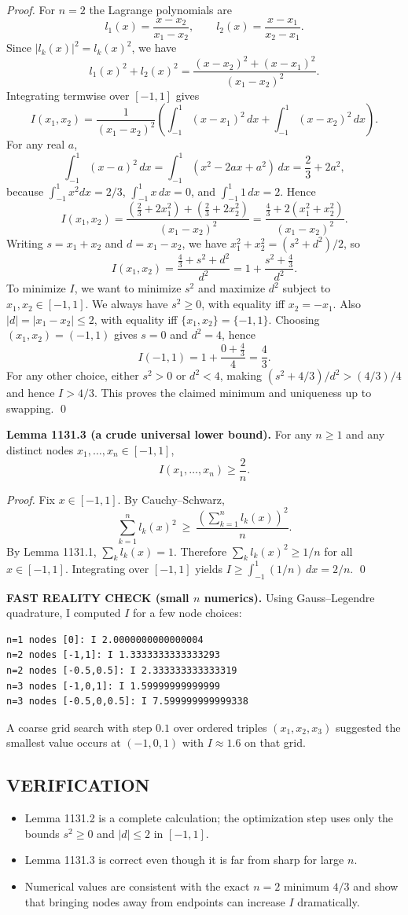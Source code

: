 \emph{Proof.}
For $n=2$ the Lagrange polynomials are
\[
 l_1(x)=\frac{x-x_2}{x_1-x_2},\qquad l_2(x)=\frac{x-x_1}{x_2-x_1}.
\]
Since $|l_k(x)|^2=l_k(x)^2$, we have
\[
 l_1(x)^2+l_2(x)^2 = \frac{(x-x_2)^2+(x-x_1)^2}{(x_1-x_2)^2}.
\]
Integrating termwise over $[-1,1]$ gives
\[
I(x_1,x_2)=\frac{1}{(x_1-x_2)^2}\left(\int_{-1}^1 (x-x_1)^2\,dx+\int_{-1}^1 (x-x_2)^2\,dx\right).
\]
For any real $a$,
\[
\int_{-1}^1 (x-a)^2\,dx=\int_{-1}^1 (x^2-2ax+a^2)\,dx=\frac{2}{3}+2a^2,
\]
because $\int_{-1}^1 x^2 dx=2/3$, $\int_{-1}^1 x\,dx=0$, and $\int_{-1}^1 1\,dx=2$.
Hence
\[
I(x_1,x_2)=\frac{(\frac{2}{3}+2x_1^2)+(\frac{2}{3}+2x_2^2)}{(x_1-x_2)^2}
=\frac{\frac{4}{3}+2(x_1^2+x_2^2)}{(x_1-x_2)^2}.
\]
Writing $s=x_1+x_2$ and $d=x_1-x_2$, we have $x_1^2+x_2^2=(s^2+d^2)/2$, so
\[
I(x_1,x_2)=\frac{\frac{4}{3}+s^2+d^2}{d^2}=1+\frac{s^2+\frac{4}{3}}{d^2}.
\]
To minimize $I$, we want to minimize $s^2$ and maximize $d^2$ subject to $x_1,x_2\in[-1,1]$.
We always have $s^2\ge 0$, with equality iff $x_2=-x_1$.
Also $|d|=|x_1-x_2|\le 2$, with equality iff $\{x_1,x_2\}=\{-1,1\}$.
Choosing $(x_1,x_2)=(-1,1)$ gives $s=0$ and $d^2=4$, hence
\[
I(-1,1)=1+\frac{0+\frac{4}{3}}{4}=\frac{4}{3}.
\]
For any other choice, either $s^2>0$ or $d^2<4$, making $(s^2+4/3)/d^2> (4/3)/4$ and hence $I>4/3$.
This proves the claimed minimum and uniqueness up to swapping.
\qed

\textbf{Lemma 1131.3 (a crude universal lower bound).}
For any $n\ge 1$ and any distinct nodes $x_1,\dots,x_n\in[-1,1]$,
\[
I(x_1,\dots,x_n)\ge \frac{2}{n}.
\]

\emph{Proof.}
Fix $x\in[-1,1]$.
By Cauchy--Schwarz,
\[
\sum_{k=1}^n l_k(x)^2\ \ge\ \frac{\left(\sum_{k=1}^n l_k(x)\right)^2}{n}.
\]
By Lemma 1131.1, $\sum_k l_k(x)=1$.
Therefore $\sum_k l_k(x)^2\ge 1/n$ for all $x\in[-1,1]$.
Integrating over $[-1,1]$ yields $I\ge \int_{-1}^1 (1/n)\,dx = 2/n$.
\qed

\textbf{FAST REALITY CHECK (small $n$ numerics).}
Using Gauss--Legendre quadrature, I computed $I$ for a few node choices:
\begin{verbatim}
n=1 nodes [0]: I 2.0000000000000004
n=2 nodes [-1,1]: I 1.3333333333333293
n=2 nodes [-0.5,0.5]: I 2.333333333333319
n=3 nodes [-1,0,1]: I 1.59999999999999
n=3 nodes [-0.5,0,0.5]: I 7.599999999999338
\end{verbatim}
A coarse grid search with step $0.1$ over ordered triples $(x_1,x_2,x_3)$ suggested the smallest value occurs at $(-1,0,1)$ with $I\approx 1.6$ on that grid.

\subsection*{VERIFICATION}
\begin{itemize}
\item Lemma 1131.2 is a complete calculation; the optimization step uses only the bounds $s^2\ge 0$ and $|d|\le 2$ in $[-1,1]$.
\item Lemma 1131.3 is correct even though it is far from sharp for large $n$.
\item Numerical values are consistent with the exact $n=2$ minimum $4/3$ and show that bringing nodes away from endpoints can increase $I$ dramatically.
\end{itemize}

